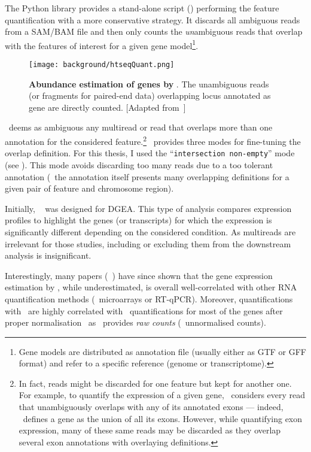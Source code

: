 The \gls{Python} library  provides a stand-alone script
(\htseq) performing the feature quantification with a more conservative strategy.
It discards all ambiguous reads from a \gls{SAM}/\gls{BAM} file and then
only counts the \emph{un}ambiguous reads that overlap with the features of
interest for a given gene model\footnote{Gene models are distributed as
annotation file (usually either as \gls{GTF} or \gls{GFF} format) and refer
to a specific reference (genome or transcriptome).}.

\begin{figure}
    \texttt{[image: background/htseqQuant.png]}\centering
    \caption[Abundance estimation of genes by
    HTSeq-count]{\label{fig:htseqEstimation}\textbf{Abundance estimation of genes
    by \htseq}. The unambiguous reads (or fragments for paired-end data)
    overlapping locus annotated as gene are directly counted. [Adapted
    from~\citet{MarPhD}]}
  \end{figure}

\htseq\ deems as ambiguous any multiread or read that overlaps more than
one annotation for the considered feature.\footnote{In fact, reads might be
discarded for one feature but kept for another one. For example, to quantify the
expression of a given gene, \htseq\ considers every read that unambiguously
overlaps with any of its annotated exons --- indeed, \htseq\ defines a gene
as the union of all its exons. However, while quantifying exon expression, many
of these same reads may be discarded as they overlap several exon annotations
with overlaying definitions.}
\htseq\ provides three modes for fine-tuning the overlap definition.
For this thesis, I used the \enquote{\texttt{intersection non-empty}} mode
(see ).
This mode avoids discarding too many reads due to a too tolerant annotation
(\ie\ the annotation itself presents many overlapping definitions for a given
pair of feature and chromosome region).

Initially, \htseq~ was designed for \gls{DGEA}.
This type of analysis compares expression profiles
to highlight the genes (or transcripts)
for which the expression is significantly different
depending on the considered condition.
As multireads are irrelevant for those studies,
including or excluding them from the downstream analysis is insignificant.

Interestingly, many papers
(\eg~\citet{Fonseca2014,errorsRNAquant,tophatStarwhatever})
have since shown that
the gene expression estimation by \htseq, while underestimated, is overall
well-correlated with other \gls{RNA} quantification methods
(\eg\ microarrays or \gls{RT-qPCR}).
Moreover, quantifications with \htseq\ are highly correlated with \cuffl\
quantifications for most of the genes after
proper normalisation~
as \htseq\ provides \emph{raw counts} (\ie\ unnormalised counts).


